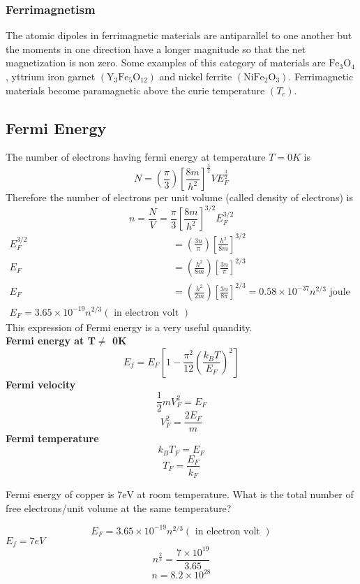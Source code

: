 \subsubsection{Ferrimagnetism}
  The atomic dipoles in ferrimagnetic materials are antiparallel to one another but the moments in one direction have a longer magnitude so that the net magnetization is non zero. Some examples of this category of materials are $\mathrm{Fe}_{3} \mathrm{O}_{4}$, yttrium iron garnet $\left(\mathrm{Y}_{3} \mathrm{Fe}_{5} \mathrm{O}_{12}\right)$ and nickel ferrite $\left(\mathrm{NiFe}_{2} \mathrm{O}_{3}\right) .$ Ferrimagnetic materials become paramagnetic above the curie temperature $\left(T_{c}\right)$.
 
  \subsection{Fermi Energy}
  The number of electrons having fermi energy at temperature $T=0K$ is \\
  $$N=\left( \frac{\pi}{3}\right) \left[ \frac{8m}{h^2}\right]^{\frac{3}{2}}VE_F^{\frac{3}{2}}$$
  Therefore the number of electrons per unit volume (called density of electrons) is
  $$
  n=\frac{N}{V}=\frac{\pi}{3}\left[\frac{8 m}{h^{2}}\right]^{3 / 2} E_{F}^{3 / 2}
  $$
  $$
  \begin{aligned}
  	E_{F}^{3 / 2} &=\left(\frac{3 n}{\pi}\right)\left[\frac{h^{2}}{8 m}\right]^{3 / 2} \\
  	E_{F} &=\left(\frac{h^{2}}{8 m}\right)\left[\frac{3 n}{\pi}\right]^{2 / 3} \\
  	E_{F} &=\left(\frac{h^{2}}{2 m}\right)\left[\frac{3 n}{8 \pi}\right]^{2 / 3}=0.58 \times 10^{-37} n^{2/3} \text { joule } \\
  	E_{F}=3.65 \times 10^{-19} n^{2 / 3}(\text { in electron volt }) &
  \end{aligned}
  $$
  This expression of Fermi energy is a very useful quandity.\\
  \textbf{Fermi energy at T$\neq$ 0K}
  $$E_f=E_F\left[ 1-\frac{\pi^2}{12}\left( \frac{k_BT}{E_F}\right) ^2\right] $$
  \textbf{Fermi velocity}
  $$\frac{1}{2}mV_F^2=E_F$$
  $$V_F^2=\frac{2E_F}{m}$$
  \textbf{Fermi temperature}
  $$k_BT_F=E_F$$
  $$T_F=\frac{E_F}{k_F}$$
  \begin{exercise}
  Fermi energy of copper is $7 \mathrm{eV}$ at room temperature. What is the total number of free electrons/unit volume at the same temperature? 
  \end{exercise}
\begin{answer}
$$	E_{F}=3.65 \times 10^{-19} n^{2 / 3}(\text { in electron volt }) $$
$E_f=7eV$\\
$$n^{\frac{2}{3}}=\frac{7\times 10^{19}}{3.65}$$
$$n=8.2\times 10^{28}$$
\end{answer}
